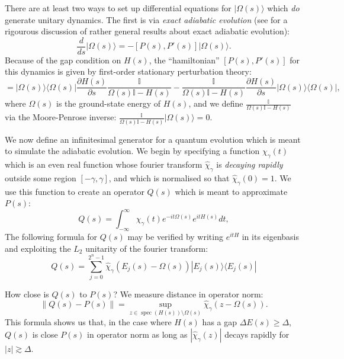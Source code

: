 \documentclass[twocolumn,lengthcheck,superscriptaddress]{revtex4-1}
\newcommand{\spectrum}{\operatorname{spec}}
\theoremstyle{definition}
\theoremstyle{remark}
\begin{document}
There are at least two ways to set up differential equations for
$|\Omega(s)\rangle$ which \emph{do} generate unitary dynamics. The
first is via \emph{exact adiabatic evolution} (see
\cite{avron:1987a, avron:1993a} for a rigourous discussion of rather
general results about exact adiabatic evolution):
\begin{equation}\label{eq:gpformula}
\frac{d}{ds} |\Omega(s)\rangle = -[P(s), P'(s)]|\Omega(s)\rangle.
\end{equation}
Because of the gap condition on $H(s)$, the ``hamiltonian''
$[P(s),P'(s)]$ for this dynamics is given by first-order stationary
perturbation theory:
\begin{equation}
[P(s), P'(s)] = |\Omega(s)\rangle \langle \Omega(s)| \frac{\partial
H(s)}{\partial s} \frac{\mathbb{I}}{\Omega(s)\mathbb{I}-H(s)} - 
\frac{\mathbb{I}}{\Omega(s)\mathbb{I}-H(s)} \frac{\partial
H(s)}{\partial s} |\Omega(s)\rangle \langle \Omega(s)|,
\end{equation}
where $\Omega(s)$ is the ground-state energy of $H(s)$, and we
define $\frac{\mathbb{I}}{\Omega(s)\mathbb{I}-H(s)}$ via the
Moore-Penrose inverse:
$\frac{\mathbb{I}}{\Omega(s)\mathbb{I}-H(s)}|\Omega(s)\rangle =0$.

We now define an infinitesimal generator for a quantum evolution
which is meant to simulate the adiabatic evolution. We begin by
specifying a function $\chi_{\gamma}(t)$ which is an even real
function whose fourier transform $\widehat{\chi}_\gamma$ is
\emph{decaying rapidly} outside some region $[-\gamma, \gamma]$, and
which is normalised so that $\widehat{\chi}_\gamma(0) =1$. We use
this function to create an operator $Q(s)$ which is meant to
approximate $P(s)$:
\begin{equation}\label{eq:gsproj}
Q(s) = \int_{-\infty}^{\infty} \chi_{\gamma}(t)
e^{-it\Omega(s)}e^{itH(s)}dt,
\end{equation}
The following formula for $Q(s)$ may be verified by writing
$e^{itH}$ in its eigenbasis and exploiting the $L_2$ unitarity of
the fourier transform:
\begin{equation}
Q(s) = \sum_{j=0}^{2^n-1} \widehat{\chi}_\gamma(E_j(s) - \Omega(s))
|E_j(s)\rangle \langle E_j(s)|
\end{equation}

How close is $Q(s)$ to $P(s)$? We measure distance in operator norm:
\begin{equation}
\|Q(s)-P(s)\| = \sup_{z \in \spectrum(H(s))\setminus \Omega(s)}
\widehat{\chi}_\gamma(z - \Omega(s)).
\end{equation}
This formula shows us that, in the case where $H(s)$ has a gap
$\Delta E(s) \ge \Delta$, $Q(s)$ is close $P(s)$ in operator norm as
long as $|\widehat{\chi}_\gamma(z)|$ decays rapidly for $|z| \gtrsim
\Delta$.
\end{document}
